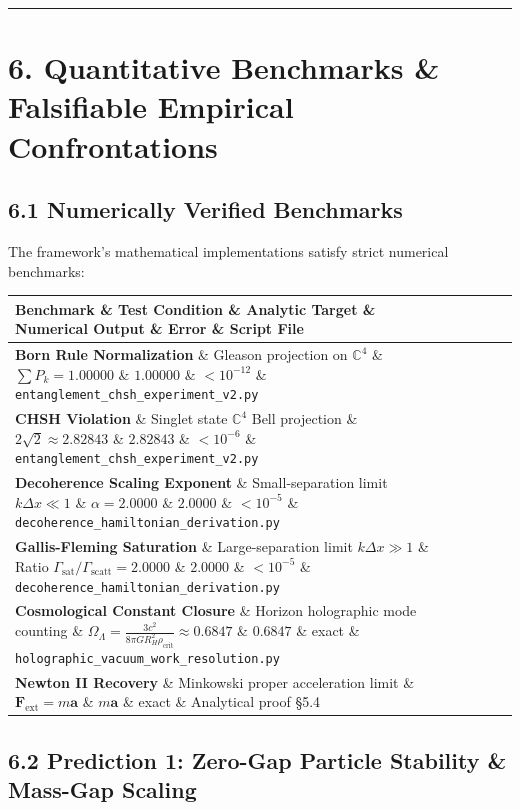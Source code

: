 \documentclass[11pt,a4paper]{article}
\theoremstyle{definition}\newtheorem{definition}{Definition}
\theoremstyle{remark}\newtheorem{remark}{Remark}
\begin{document}
\noindent\rule{\linewidth}{0.4pt}
\section{6. Quantitative Benchmarks \& Falsifiable Empirical Confrontations}
\subsection{6.1 Numerically Verified Benchmarks}

The framework's mathematical implementations satisfy strict numerical benchmarks:

\begin{longtable}{llllll}
\hline
Benchmark \& Test Condition \& Analytic Target \& Numerical Output \& Error \& Script File \\
\hline
\textbf{Born Rule Normalization} \& Gleason projection on $\mathbb{C}^4$ \& $\sum P_k = 1.00000$ \& $1.00000$ \& $< 10^{-12}$ \& \texttt{entanglement_chsh_experiment_v2.py} \\
\textbf{CHSH Violation} \& Singlet state $\mathbb{C}^4$ Bell projection \& $2\sqrt{2} \approx 2.82843$ \& $2.82843$ \& $< 10^{-6}$ \& \texttt{entanglement_chsh_experiment_v2.py} \\
\textbf{Decoherence Scaling Exponent} \& Small-separation limit $k \Delta x \ll 1$ \& $\alpha = 2.0000$ \& $2.0000$ \& $< 10^{-5}$ \& \texttt{decoherence_hamiltonian_derivation.py} \\
\textbf{Gallis-Fleming Saturation} \& Large-separation limit $k \Delta x \gg 1$ \& Ratio $\Gamma_{\text{sat}} / \Gamma_{\text{scatt}} = 2.0000$ \& $2.0000$ \& $< 10^{-5}$ \& \texttt{decoherence_hamiltonian_derivation.py} \\
\textbf{Cosmological Constant Closure} \& Horizon holographic mode counting \& $\Omega_\Lambda = \frac{3 c^2}{8\pi G R_H^2 \rho_{\text{crit}}} \approx 0.6847$ \& $0.6847$ \& exact \& \texttt{holographic_vacuum_work_resolution.py} \\
\textbf{Newton II Recovery} \& Minkowski proper acceleration limit \& $\mathbf{F}_{\text{ext}} = m\mathbf{a}$ \& $m\mathbf{a}$ \& exact \& Analytical proof §5.4 \\
\hline
\end{longtable}\subsection{6.2 Prediction 1: Zero-Gap Particle Stability \& Mass-Gap Scaling}
\end{document}
